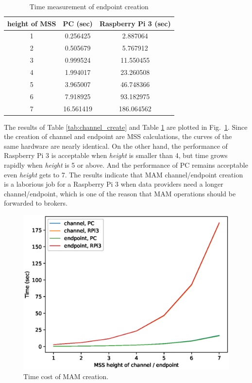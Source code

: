 \documentclass[conference]{IEEEtran}
\begin{document}
\begin{table}[htbp]
	\caption{Time measurement of endpoint creation}
	\label{tab:endpoint_create}
	\begin{center}
	\begin{tabular}{|c|c|c|}
	\hline
		\textbf{height of MSS} & \textbf{PC (sec)} & \textbf{Raspberry Pi 3 (sec)} \\ 
		\hline
		1 & 0.256425 & 2.887064 \\ 
		2 & 0.505679 & 5.767912 \\ 
		3 & 0.999524 & 11.550455 \\ 
		4 & 1.994017 & 23.260508 \\ 
		5 & 3.965007 & 46.748366 \\ 
		6 & 7.918925 & 93.182975 \\ 
		7 & 16.561419 & 186.064562 \\
		\hline
	\end{tabular}
	\end{center}
\end{table}

The results of Table \ref{tab:channel_create} and Table \ref{tab:endpoint_create} are plotted in Fig.~\ref{fig:mam_create}. Since the creation of channel and endpoint are MSS calculations, the curves of the same hardware are nearly identical. On the other hand, the performance of Raspberry Pi 3 is acceptable when \textit{height} is smaller than 4, but time grows rapidly when \textit{height} is 5 or above. And the performance of PC remains acceptable even \textit{height} gets to 7. The results indicate that MAM channel/endpoint creation is a laborious job for a Raspberry Pi 3 when data providers need a longer channel/endpoint, which is one of the reason that MAM operations should be forwarded to brokers.
  
\begin{figure}[!t]
    \centering
    \includegraphics[width=3.in]{mam_create}
    \caption{Time cost of MAM creation.}
    \label{fig:mam_create}
\end{figure}
\end{document}
